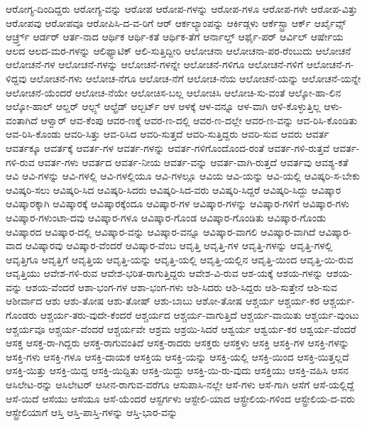 {ಆರೋಗ್ಯ-ದಿಂದಿದ್ದರು
ಆರೋಗ್ಯ-ವನ್ನು
ಆರೋಪ
ಆರೋಪ-ಗಳನ್ನು
ಆರೋಪ-ಗಳೂ
ಆರೋಪ-ಗಳೇ
ಆರೋಪ-ವಿತ್ತು
ಆರೋಪವು
ಆರೋಪವೂ
ಆರೋಪಿಸಿ-ದ-ವ-ರಿಗೆ
ಆರ್
ಆರ್ಕಲ್ಯಾಂಪನ್ನು
ಆರ್ಕಿಡ್ಗಳು
ಆರ್ಕೆಸ್ಟ್ರಾ
ಆರ್ಕ್
ಆರ್ಖೈವ್ಸ್
ಆರ್ಚ್ರ್ಡ್
ಆರ್ಡರ್
ಆರ್ತ-ನಾದ
ಆರ್ಥಿಕ
ಆರ್ಥಿ-ಕತೆ
ಆರ್ಥಿಕ-ತೆಗೆ
ಆರ್ನಾಲ್ಡ್
ಆರ್ಫೈ-ಪರ್
ಆರ್ವಿಲ್
ಆರ್ಷೇಯ
ಆಲದ
ಆಲದ-ಮರ-ಗಳನ್ನು
ಆಲಿಫ್ಯಾಟಿಕ್
ಆಲಿ-ಸುತ್ತಿದ್ದೀರಿ
ಆಲೋಚನಾ
ಆಲೋಚನಾ-ಪರ-ರೆಂಬುದು
ಆಲೋಚನೆ
ಆಲೋಚನೆ-ಗಳ
ಆಲೋಚನೆ-ಗಳನ್ನು
ಆಲೋಚನೆ-ಗಳನ್ನೇ
ಆಲೋಚನೆ-ಗಳಿಗೂ
ಆಲೋಚನೆ-ಗಳಿಗೆ
ಆಲೋಚನೆ-ಗ-ಳಿದ್ದವು
ಆಲೋಚನೆ-ಗಳು
ಆಲೋಚ-ನೆಗೂ
ಆಲೋಚ-ನೆಗೆ
ಆಲೋಚ-ನೆಯ
ಆಲೋಚನೆ-ಯನ್ನು
ಆಲೋಚನೆ-ಯನ್ನೇ
ಆಲೋಚನೆ-ಯೆಂದರೆ
ಆಲೋಚ-ನೆಯೇ
ಆಲೋಚಿಸ-ಬಲ್ಲ
ಆಲೋಚಿಸಿ
ಆಲೋಚಿ-ಸು-ವಂತೆ
ಆಲ್ಕೋ-ಹಾ-ಲಿನ
ಆಲ್ಕೋ-ಹಾಲ್
ಆಲ್ಡರ್
ಆಲ್ಪ್ಸ್
ಆಲ್ಫ್ರೆಡ್
ಆಲ್ಬರ್ಟ್
ಆಳ
ಆಳಕ್ಕೆ
ಆಳ-ವನ್ನೂ
ಆಳ-ವಾಗಿ
ಆಳಿ-ಕೊಳ್ಳುತ್ತಿಲ್ಲ
ಆಳು-ವಂತಾಗಿದೆ
ಆಳ್ವಾರ್
ಆವ-ಕೆಂಪು
ಆವರ-ಣಕ್ಕೆ
ಆವರ-ಣ-ದಲ್ಲಿ
ಆವರ-ಣ-ದಲ್ಲೇ
ಆವರ-ಣ-ವನ್ನು
ಆವ-ರಿಸಿ-ಕೊಂಡಿತು
ಆವ-ರಿಸಿ-ಕೊಂಡು
ಆವರಿ-ಸಿತ್ತು
ಆವ-ರಿಸಿದ
ಆವರಿ-ಸುತ್ತದೆ
ಆವರಿ-ಸುತ್ತಿದ್ದರು
ಆವರಿ-ಸುವ
ಆವರು
ಆವರ್ತ
ಆವರ್ತಕ್ಕೂ
ಆವರ್ತಕ್ಕೆ
ಆವರ್ತ-ಗಳ
ಆವರ್ತ-ಗಳನ್ನು
ಆವರ್ತ-ಗಳಿಗೊಂದೊಂದ-ರಂತೆ
ಆವರ್ತ-ಗಳಿ-ರುತ್ತವೆ
ಆವರ್ತ-ಗಳಿ-ರುವ
ಆವರ್ತ-ಗಳು
ಆವರ್ತದ
ಆವರ್ತ-ನೀಯ
ಆವರ್ತ-ವನ್ನು
ಆವರ್ತ-ವಾಗಿ-ರುತ್ತದೆ
ಆವರ್ತವು
ಆವಶ್ಯ-ಕತೆ
ಆವಿ
ಆವಿ-ಗಳನ್ನು
ಆವಿ-ಗಳಲ್ಲಿ
ಆವಿ-ಗಳಲ್ಲಿಯೂ
ಆವಿ-ಗಳಲ್ಲೂ
ಆವಿಯ
ಆವಿ-ಯನ್ನು
ಆವಿ-ಯಲ್ಲಿ
ಆವಿಷ್ಕರಿ-ಸ-ಬೇಕು
ಆವಿಷ್ಕರಿ-ಸಲು
ಆವಿಷ್ಕರಿ-ಸಿದ
ಆವಿಷ್ಕರಿ-ಸಿದರು
ಆವಿಷ್ಕರಿ-ಸಿದ-ವರು
ಆವಿಷ್ಕರಿ-ಸಿದ್ದರೆ
ಆವಿಷ್ಕರಿ-ಸಿದ್ದು
ಆವಿಷ್ಕಾರ
ಆವಿಷ್ಕಾರಕ್ಕಾಗಿ
ಆವಿಷ್ಕಾರಕ್ಕೆ
ಆವಿಷ್ಕಾರಕ್ಕೆಂದೂ
ಆವಿಷ್ಕಾರ-ಗಳ
ಆವಿಷ್ಕಾರ-ಗಳನ್ನು
ಆವಿಷ್ಕಾರ-ಗಳಿಗೆ
ಆವಿಷ್ಕಾರ-ಗಳು
ಆವಿಷ್ಕಾರ-ಗಳುಂಟಾ-ದವು
ಆವಿಷ್ಕಾರ-ಗಳೂ
ಆವಿಷ್ಕಾರ-ಗೊಂಡ
ಆವಿಷ್ಕಾರ-ಗೊಂಡಿತು
ಆವಿಷ್ಕಾರ-ಗೊಂಡು
ಆವಿಷ್ಕಾರದ
ಆವಿಷ್ಕಾರ-ದಲ್ಲಿ
ಆವಿಷ್ಕಾರ-ವನ್ನು
ಆವಿಷ್ಕಾರ-ವನ್ನೂ
ಆವಿಷ್ಕಾರ-ವಾಗಲಿ
ಆವಿಷ್ಕಾರ-ವಾಗಿದೆ
ಆವಿಷ್ಕಾರ-ವಾದ
ಆವಿಷ್ಕಾರವು
ಆವಿಷ್ಕಾರ-ವೆಂದರೆ
ಆವಿಷ್ಕಾರ-ವೆಂಬ
ಆವೃತ್ತಿ
ಆವೃತ್ತಿ-ಗಳ
ಆವೃತ್ತಿ-ಗಳನ್ನು
ಆವೃತ್ತಿ-ಗಳಲ್ಲಿ
ಆವೃತ್ತಿಗೂ
ಆವೃತ್ತಿಗೆ
ಆವೃತ್ತಿಯ
ಆವೃತ್ತಿ-ಯನ್ನು
ಆವೃತ್ತಿ-ಯಲ್ಲಿ
ಆವೃತ್ತಿ-ಯಲ್ಲಿನ
ಆವೃತ್ತಿ-ಯಿಂದ
ಆವೃತ್ತಿ-ಯಿ-ರುವ
ಆವೃತ್ತಿಯು
ಆವೇಶ-ಗಳಿ-ರುವ
ಆವೇಶ-ಭರಿತ-ರಾಗುತ್ತಿದ್ದರು
ಆವೇಶ-ವಿ-ರುವ
ಆಶ-ಯಕ್ಕೆ
ಆಶಯ-ಗಳನ್ನು
ಆಶಯ-ವನ್ನು
ಆಶಯ-ವೆಂದರೆ
ಆಶಾ-ಭಂಗ-ಗಳ
ಆಶಾ-ಭಂಗ-ಗಳು
ಆಶಿ-ಸಿದರು
ಆಶಿ-ಸಿದ್ದರು
ಆಶಿ-ಸುತ್ತೇನೆ
ಆಶಿ-ಸುವ
ಆಶೀರ್ವಾದ
ಆಶು
ಆಶು-ತೋಷ
ಆಶು-ತೋಷ್
ಆಶು-ಬಾಬು
ಆಶೋ-ತೋಷ
ಆಶ್ಚರ್ಯ
ಆಶ್ಚರ್ಯ-ಕರ
ಆಶ್ಚರ್ಯ-ಗೊಂಡರು
ಆಶ್ಚರ್ಯ-ತರು-ವುದೇ-ಕೆಂದರೆ
ಆಶ್ಚರ್ಯದ
ಆಶ್ಚರ್ಯ-ವಾಗುತ್ತಿದೆ
ಆಶ್ಚರ್ಯ-ವಾಯಿತು
ಆಶ್ಚರ್ಯ-ವುಂಟು
ಆಶ್ಚರ್ಯವೂ
ಆಶ್ಚರ್ಯ-ವೆಂದರೆ
ಆಶ್ಚರ್ಯವೇ
ಆಶ್ರಮ
ಆಶ್ರಯಿ-ಸಿದರೆ
ಆಶ್ವರ್ಯ
ಆಶ್ವರ್ಯ-ಕರ
ಆಶ್ವರ್ಯ-ವೆಂದರೆ
ಆಸಕ್ತ
ಆಸಕ್ತ-ರಾ-ಗಿದ್ದರು
ಆಸಕ್ತ-ರಾಗುವಂತಿದೆ
ಆಸಕ್ತ-ರಾದರು
ಆಸಕ್ತರು
ಆಸಕ್ತಳು
ಆಸಕ್ತಿ
ಆಸಕ್ತಿ-ಗಳ
ಆಸಕ್ತಿ-ಗಳನ್ನು
ಆಸಕ್ತಿ-ಗಳು
ಆಸಕ್ತಿ-ಗಳೂ
ಆಸಕ್ತಿ-ದಾಯಕ
ಆಸಕ್ತಿಯ
ಆಸಕ್ತಿ-ಯನ್ನು
ಆಸಕ್ತಿ-ಯಲ್ಲಿ
ಆಸಕ್ತಿ-ಯಿಂದ
ಆಸಕ್ತಿ-ಯಿತ್ತಲ್ಲದೆ
ಆಸಕ್ತಿ-ಯಿತ್ತು
ಆಸಕ್ತಿ-ಯಿದ್ದ
ಆಸಕ್ತಿ-ಯಿದ್ದಿತು
ಆಸಕ್ತಿ-ಯಿದ್ದು
ಆಸಕ್ತಿ-ಯಿ-ರು-ವುದು
ಆಸಕ್ತಿಯು
ಆಸಕ್ತಿ-ವಹಿಸಿ
ಆಸನ
ಆಸಿಲೇಟ-ರನ್ನು
ಆಸಿಲೇಟರ್
ಆಸೀನ-ರಾಗುವ-ವರೆಗೂ
ಆಸುಪಾಸಿ-ನಲ್ಲೇ
ಆಸೆ-ಗಳು
ಆಸೆ-ಗಾಗಿ
ಆಸೆಗೆ
ಆಸೆ-ಯಲ್ಲಿದ್ದೆ
ಆಸೆ-ಯಿದೆ
ಆಸೆಯು
ಆಸೆಯೂ
ಆಸೆ-ಯೆಂದರೆ
ಆಸ್ಟರ್ಗಳು
ಆಸ್ಟೇಲಿ-ಯಾದ
ಆಸ್ಟ್ರೇಲಿಯ-ಗಳಿಂದ
ಆಸ್ಟ್ರೇಲಿಯ-ದ-ವರು
ಆಸ್ಟ್ರೇಲಿಯಾಗೆ
ಆಸ್ತಿ
ಆಸ್ತಿ-ಪಾಸ್ತಿ-ಗಳನ್ನು
ಆಸ್ತಿ-ಭಾರ-ವನ್ನು
}
